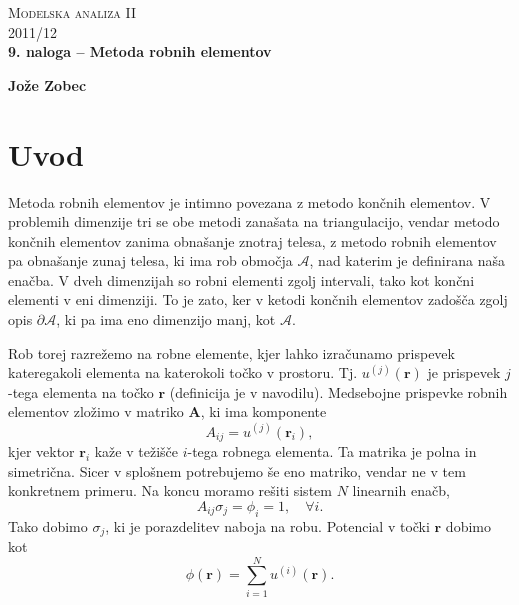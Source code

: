 \documentclass[a4 paper, 12pt]{article}
\renewcommand{\r}{
	\ensuremath{\mathbf{r}}
}
\begin{document}
\begin{center}
\textsc{Modelska analiza II}\\
\textsc{2011/12}\\[0.5cm]
\textbf{9. naloga -- Metoda robnih elementov}
\end{center}
\begin{flushright}
\textbf{Jože Zobec}\\
\end{flushright}

\section{Uvod}

Metoda robnih elementov je intimno povezana z metodo kon\v cnih elementov. V problemih dimenzije tri se
obe metodi zana\v sata na triangulacijo, vendar metodo kon\v cnih elementov zanima obna\v sanje znotraj telesa,
z metodo robnih elementov pa obna\v sanje zunaj telesa, ki ima rob obmo\v cja $\mathcal{A}$, nad katerim
je definirana na\v sa ena\v cba. V dveh dimenzijah so robni elementi zgolj intervali, tako kot kon\v cni
elementi v eni dimenziji. To je zato, ker v ketodi kon\v cnih elementov zado\v s\v ca zgolj opis
$\partial \mathcal{A}$, ki pa ima eno dimenzijo manj, kot $\mathcal{A}$.

Rob torej razre\v zemo na robne elemente, kjer lahko izra\v cunamo prispevek kateregakoli elementa na
katerokoli to\v cko v prostoru. Tj. $u^{(j)}(\r)$ je prispevek $j$-tega elementa na to\v cko $\r$ (definicija
je v navodilu). Medsebojne prispevke robnih elementov zlo\v zimo v matriko $\mathbf{A}$, ki ima komponente
\[
	A_{ij} = u^{(j)}(\r_i),
\]
kjer vektor $\r_i$ ka\v ze v te\v zi\v s\v ce $i$-tega robnega elementa.
Ta matrika je polna in simetri\v cna. Sicer v splo\v snem potrebujemo \v se eno matriko, vendar ne v
tem konkretnem primeru. Na koncu moramo re\v siti sistem $N$ linearnih ena\v cb,
\[
	A_{ij} \sigma_j = \phi_i = 1, \quad \forall i.
\] 
Tako dobimo $\sigma_j$, ki je porazdelitev naboja na robu. Potencial v to\v cki $\r$ dobimo kot
\[
	\phi(\r) = \sum_{i = 1}^N u^{(i)} (\r).
\] 
\end{document}
